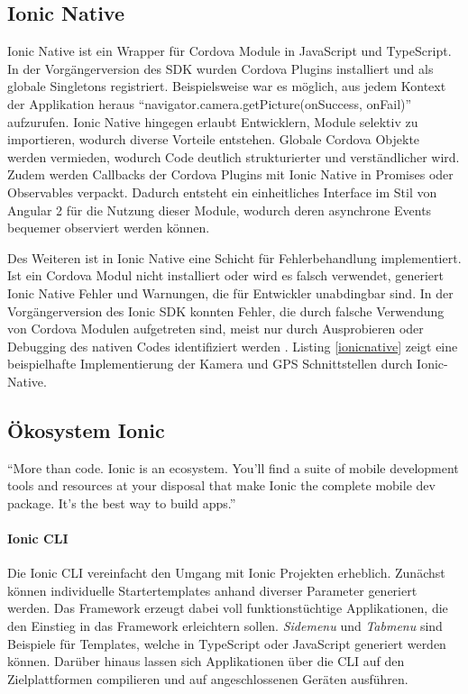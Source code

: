 \subsection{Ionic Native}

Ionic Native ist ein Wrapper für Cordova Module in JavaScript und TypeScript.
In der Vorgängerversion des \ac{SDK} wurden Cordova Plugins installiert und als globale Singletons registriert.
Beispielsweise war es möglich, aus jedem Kontext der Applikation heraus ``navigator.camera.getPicture(onSuccess, onFail)'' aufzurufen.
Ionic Native hingegen erlaubt Entwicklern, Module selektiv zu importieren, wodurch diverse Vorteile entstehen.
Globale Cordova Objekte werden vermieden, wodurch Code deutlich strukturierter und verständlicher wird.
Zudem werden Callbacks der Cordova Plugins mit Ionic Native in Promises oder Observables verpackt.
Dadurch entsteht ein einheitliches Interface im Stil von Angular 2 für die Nutzung dieser Module,
wodurch deren asynchrone Events bequemer observiert werden können.

Des Weiteren ist in Ionic Native eine Schicht für Fehlerbehandlung implementiert.
Ist ein Cordova Modul nicht installiert oder wird es falsch verwendet,
generiert Ionic Native Fehler und Warnungen, die für Entwickler unabdingbar sind.
In der Vorgängerversion des Ionic \ac{SDK} konnten Fehler, die durch falsche Verwendung von
Cordova Modulen aufgetreten sind, meist nur durch Ausprobieren oder Debugging des nativen Codes identifiziert werden
\cite{ionic55:online}.
Listing \ref{ionicnative} zeigt eine beispielhafte Implementierung der Kamera und GPS Schnittstellen durch Ionic-Native.

\vspace{0.3cm}



\subsection{Ökosystem Ionic}

``More than code. Ionic is an ecosystem. You'll find a suite of mobile development tools and resources at your disposal that make
Ionic the complete mobile dev package. It's the best way to build apps.'' \cite{Ionic20:online}
\vspace{0.3cm}

\paragraph{Ionic \ac{CLI}}
Die Ionic \ac{CLI} vereinfacht den Umgang mit Ionic Projekten erheblich. Zunächst können individuelle
Startertemplates anhand diverser Parameter generiert werden.
Das Framework erzeugt dabei voll funktionstüchtige Applikationen, die den Einstieg in das Framework erleichtern sollen.
\emph{Sidemenu} und \emph{Tabmenu} sind Beispiele für Templates, welche in TypeScript oder JavaScript generiert werden können.
Darüber hinaus lassen sich Applikationen über die \ac{CLI} auf den Zielplattformen compilieren und auf angeschlossenen Geräten ausführen.

